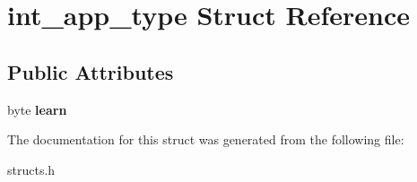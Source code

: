 \hypertarget{structint__app__type}{}\section{int\+\_\+app\+\_\+type Struct Reference}
\label{structint__app__type}
\subsection*{Public Attributes}
\begin{DoxyCompactItemize}
\item 
\mbox{\label{structint__app__type_a6fbea354e1b43848af48de4735940dc3}} 
byte {\bfseries learn}
\end{DoxyCompactItemize}


The documentation for this struct was generated from the following file\+:\begin{DoxyCompactItemize}
\item 
structs.\+h\end{DoxyCompactItemize}
